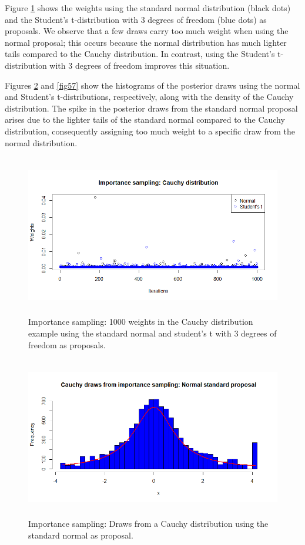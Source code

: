 Figure \ref{fig55} shows the weights using the standard normal distribution (black dots) and the Student's t-distribution with 3 degrees of freedom (blue dots) as proposals. We observe that a few draws carry too much weight when using the normal proposal; this occurs because the normal distribution has much lighter tails compared to the Cauchy distribution. In contrast, using the Student's t-distribution with 3 degrees of freedom improves this situation.

Figures \ref{fig56} and \ref{fig57} show the histograms of the posterior draws using the normal and Student's t-distributions, respectively, along with the density of the Cauchy distribution. The spike in the posterior draws from the standard normal proposal arises due to the lighter tails of the standard normal compared to the Cauchy distribution, consequently assigning too much weight to a specific draw from the normal distribution.

\begin{figure}[!h]
	\includegraphics[width=340pt, height=200pt]{Chapters/chapter5/figures/ISexampleCauchy.png}
	\caption[List of figure caption goes here]{Importance sampling: 1000 weights in the Cauchy distribution example using the standard normal and student's t with 3 degrees of freedom as proposals.}\label{fig55}
\end{figure} 

\begin{figure}[!h]
	\includegraphics[width=340pt, height=200pt]{Chapters/chapter5/figures/IScauchyNormal.png}
	\caption[List of figure caption goes here]{Importance sampling: Draws from a Cauchy distribution using the standard normal as proposal.}\label{fig56}
\end{figure} 

